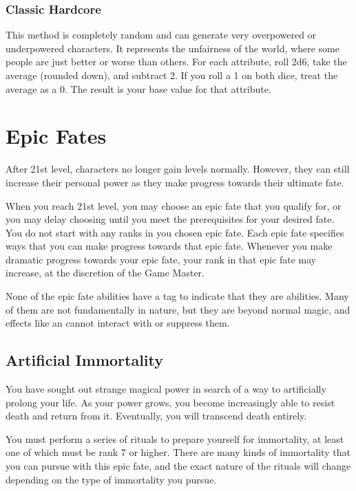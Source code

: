     \subsubsection{Classic Hardcore}

      This method is completely random and can generate very overpowered or underpowered characters.
      It represents the unfairness of the world, where some people are just better or worse than others.
      For each attribute, roll 2d6, take the average (rounded down), and subtract 2.
      If you roll a 1 on both dice, treat the average as a 0.
      The result is your base value for that attribute.

\section{Epic Fates}
  After 21st level, characters no longer gain levels normally.
  However, they can still increase their personal power as they make progress towards their ultimate fate.

  When you reach 21st level, you may choose an epic fate that you qualify for, or you may delay choosing until you meet the prerequisites for your desired fate.
  You do not start with any ranks in you chosen epic fate.
  Each epic fate specifies ways that you can make progress towards that epic fate.
  Whenever you make dramatic progress towards your epic fate, your rank in that epic fate may increase, at the discretion of the Game Master.

  None of the epic fate abilities have a tag to indicate that they are \magical abilities.
  Many of them are not fundamentally  in nature, but they are beyond normal magic, and effects like an  cannot interact with or suppress them.

  \subsection{Artificial Immortality}
    You have sought out strange magical power in search of a way to artificially prolong your life.
    As your power grows, you become increasingly able to resist death and return from it.
    Eventually, you will transcend death entirely.

     You must perform a series of rituals to prepare yourself for immortality, at least one of which must be rank 7 or higher. There are many kinds of immortality that you can pursue with this epic fate, and the exact nature of the rituals will change depending on the type of immortality you pursue.

